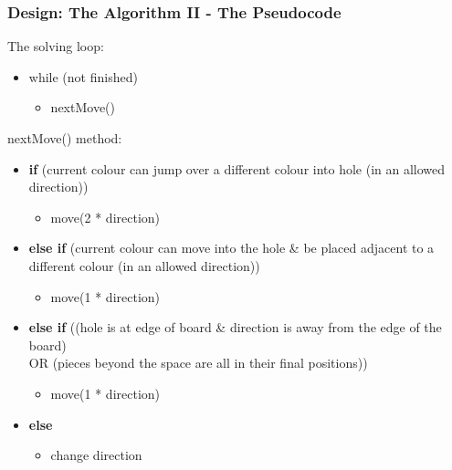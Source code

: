 \documentclass{beamer}
\begin{document}
	\begin{frame}
		\frametitle{Design: The Algorithm II - The Pseudocode}
		The solving loop:
		\begin{itemize}
			\item[] while (not finished)
			\begin{itemize}
				\item[] nextMove()
			\end{itemize}		
		\end{itemize}
		\bigskip
		nextMove() method:
		\begin{itemize}
			\item[] \textbf{if} (current colour can jump over a different colour into hole (in an allowed direction))
			\begin{itemize}
				\item[] move(2 * direction)
			\end{itemize}	
			\item[] \textbf{else if}	(current colour can move into the hole \& be placed adjacent 
			to a different colour (in an allowed direction))
			\begin{itemize}
				\item[] move(1 * direction)
			\end{itemize}
			
			\item[] \textbf{else if}	((hole is at edge of board \& direction is away from the edge of the board) \\
			OR (pieces beyond the space are all in their final positions))
			\begin{itemize}
				\item[] move(1 * direction)
			\end{itemize}
			\item[] \textbf{else} 
			\begin{itemize}
				\item[] change direction
			\end{itemize}

		\end{itemize}
		
		
	\end{frame}
	
\end{document}
